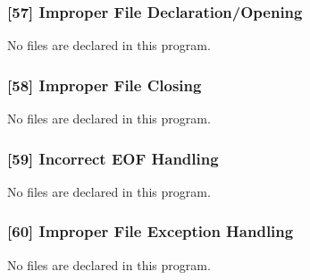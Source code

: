 \subsubsection{[57] Improper File Declaration/Opening}

No files are declared in this program.

\subsubsection{[58] Improper File Closing}

No files are declared in this program.

\subsubsection{[59] Incorrect EOF Handling}

No files are declared in this program.

\subsubsection{[60] Improper File Exception Handling}

No files are declared in this program.
